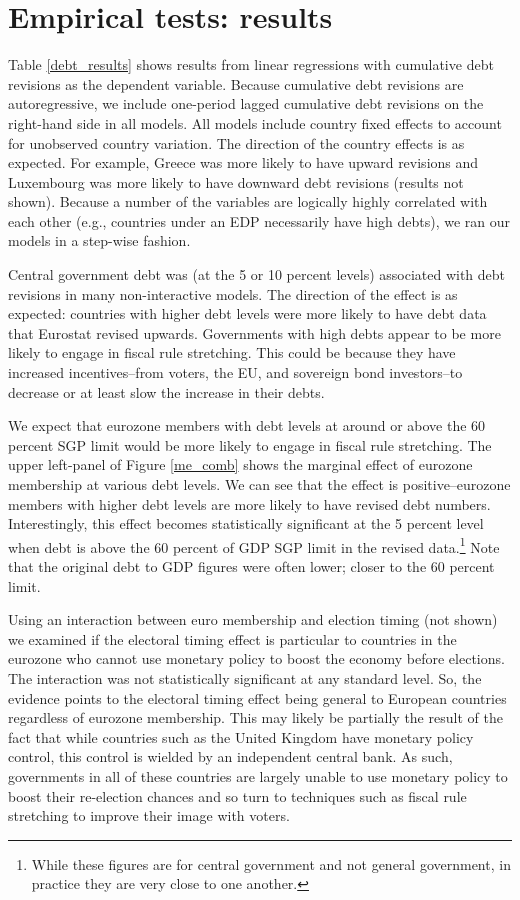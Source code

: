 \documentclass[]{article}
\begin{document}
\section{Empirical tests: results}

Table \ref{debt_results} shows results from linear regressions with cumulative debt revisions as the dependent variable. Because cumulative debt revisions are autoregressive, we include one-period lagged cumulative debt revisions on the right-hand side in all models. All models include country fixed effects to account for unobserved country variation. The direction of the country effects is as expected. For example, Greece was more likely to have upward revisions and Luxembourg was more likely to have downward debt revisions (results not shown). Because a number of the variables are logically highly correlated with each other (e.g., countries under an EDP necessarily have high debts), we ran our models in a step-wise fashion.

Central government debt was (at the 5 or 10 percent levels) associated with debt revisions in many non-interactive models. The direction of the effect is as expected: countries with higher debt levels were more likely to have debt data that Eurostat revised upwards. Governments with high debts appear to be more likely to engage in fiscal rule stretching. This could be because they have increased incentives--from voters, the EU, and sovereign bond investors--to decrease or at least slow the increase in their debts.

We expect that eurozone members with debt levels at around or above the 60 percent SGP limit would be more likely to engage in fiscal rule stretching. The upper left-panel of Figure \ref{me_comb} shows the marginal effect of eurozone membership at various debt levels. We can see that the effect is positive--eurozone members with higher debt levels are more likely to have revised debt numbers. Interestingly, this effect becomes statistically significant at the 5 percent level when debt is above the 60 percent of GDP SGP limit in the revised data.\footnote{While these figures are for central government and not general government, in practice they are very close to one another.} Note that the original debt to GDP figures were often lower; closer to the 60 percent limit.

Using an interaction between euro membership and election timing (not shown) we examined if the electoral timing effect is particular to countries in the eurozone who cannot use monetary policy to boost the economy before elections. The interaction was not statistically significant at any standard level. So, the evidence points to the electoral timing effect being general to European countries regardless of eurozone membership. This may likely be partially the result of the fact that while countries such as the United Kingdom have monetary policy control, this control is wielded by an independent central bank. As such, governments in all of these countries are largely unable to use monetary policy to boost their re-election chances and so turn to techniques such as fiscal rule stretching to improve their image with voters.
\end{document}
